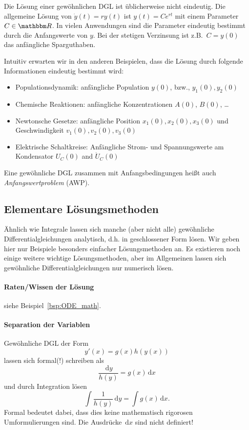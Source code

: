 \documentclass[12pt,a4paper]{book}
\theoremstyle{break}
\theoremstyle{nonumberplain}
\newcommand{\R}{\mathbbm R}
\newcommand{\1}{\mathbbm{1}} 			      	%
\newcommand{\dx}[1][x]{\ensuremath{\, \mathrm{d} #1}} 	%
\begin{document}
Die Lösung einer gewöhnlichen DGL ist üblicherweise nicht eindeutig. Die allgemeine Lösung von $\dot y(t)=ry(t)$ 
ist $y(t)=Ce^{rt}$ mit einem Parameter $C\in \R$. In vielen Anwendungen sind die Parameter eindeutig
bestimmt durch die Anfangswerte von $y$. Bei der stetigen Verzinsung ist z.B.\ $C=y(0)$ das anfängliche
Sparguthaben.

Intuitiv erwarten wir in den anderen Beispielen, dass die Lösung durch folgende Informationen eindeutig bestimmt wird:
\begin{itemize}
\item Populationsdynamik: anfängliche Population $y(0)$, bzw., $y_1(0),y_2(0)$
\item Chemische Reaktionen: anfängliche Konzentrationen $A(0)$, $B(0)$, \ldots
\item Newtonsche Gesetze: anfängliche Position $x_1(0),x_2(0),x_3(0)$ und Geschwindigkeit $v_1(0),v_2(0),v_3(0)$
\item Elektrische Schaltkreise: Anfängliche Strom- und Spannungswerte am Kondensator $U_C(0)$ and $\dot U_C(0)$
\end{itemize}

Eine gewöhnliche DGL zusammen mit Anfangsbedingungen heißt auch \emph{Anfangswertproblem} (AWP).

\subsection{Elementare Lösungsmethoden}

Ähnlich wie Integrale lassen sich manche (aber nicht alle) gewöhnliche
Differentialgleichungen analytisch, d.h. in geschlossener Form lösen. Wir geben hier nur Beispiele 
besonders einfacher Lösungsmethoden an. Es existieren noch einige weitere wichtige Lösungsmethoden,
aber im Allgemeinen lassen sich gewöhnliche Differentialgleichungen nur numerisch lösen.



\paragraph{Raten/Wissen der Lösung}

siehe Beispiel~\ref{bsp:ODE_math}.

\paragraph{Separation der Variablen}

Gewöhnliche DGL der Form 
\[
y'(x)=g(x) h(y(x))
\]
lassen sich formal(!) schreiben als
\begin{equation}
\frac{\dx[y]}{h(y)}=g(x)\dx
\end{equation}
und durch Integration lösen
\begin{equation}
\int \frac{1}{h(y)} \dx[y]=\int g(x)\dx.
\end{equation}
Formal bedeutet dabei, dass dies keine mathematisch rigorosen Umformulierungen sind.
Die Ausdrücke $\dx$ sind nicht definiert! 
\end{document}
